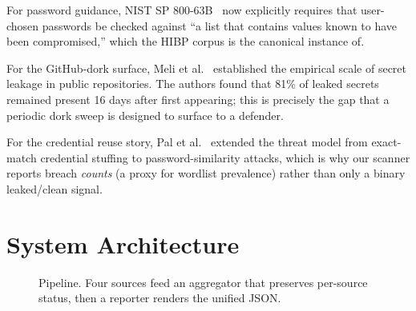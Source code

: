 \documentclass[conference]{IEEEtran}
\begin{document}
For password guidance, NIST SP 800-63B~\cite{nist80063b} now
explicitly requires that user-chosen passwords be checked against
``a list that contains values known to have been compromised,''
which the HIBP corpus is the canonical instance of.

For the GitHub-dork surface, Meli et al.~\cite{meli2019gitleaks}
established the empirical scale of secret leakage in public
repositories. The authors found that 81\% of leaked secrets remained
present 16 days after first appearing; this is precisely the gap
that a periodic dork sweep is designed to surface to a defender.

For the credential reuse story, Pal et
al.~\cite{pal2019beyond} extended the threat model from exact-match
credential stuffing to password-similarity attacks, which is why our
scanner reports breach \emph{counts} (a proxy for wordlist
prevalence) rather than only a binary leaked/clean signal.

\section{System Architecture}

\begin{figure}[htbp]
\centering
{}
\caption{Pipeline. Four sources feed an aggregator that preserves
per-source status, then a reporter renders the unified JSON.}
\label{fig:pipeline}
\end{figure}
\end{document}
